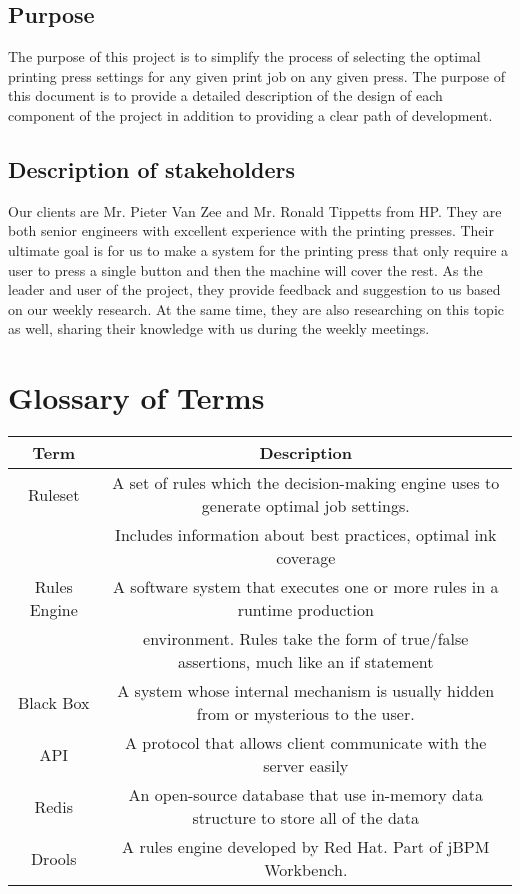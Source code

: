 \documentclass[draftclsnofoot,onecolumn,10pt,compsoc]{IEEEtran}
\begin{document}
\subsection{Purpose}
The purpose of this project is to simplify the process of selecting the optimal printing press settings for any given print job on any given press. The purpose of this document is to provide a detailed description of the design of each component of the project in addition to providing a clear path of development.

\subsection{Description of stakeholders}
Our clients are Mr. Pieter Van Zee and Mr. Ronald Tippetts from HP. They are both senior engineers with excellent experience with the printing presses. Their ultimate goal is for us to make a system for the printing press that only require a user to press a single button and then the machine will cover the rest. As the leader and user of the project, they provide feedback and suggestion to us based on our weekly research. At the same time, they are also researching on this topic as well, sharing their knowledge with us during the weekly meetings.

\bigskip
\section{Glossary of Terms}
\begin{center}
    \begin{tabular}{|c|c|}
        \hline
        \textbf{Term} & \textbf{Description}\\
        \hline
        Ruleset & A set of rules which the decision-making engine uses to generate optimal job settings.\\ & Includes information about best practices, optimal ink coverage\\
        \hline
        Rules Engine & A software system that executes one or more rules in a runtime production\\& environment. Rules take the form of true/false assertions, much like an if statement\\
        \hline
        Black Box & A system whose internal mechanism is usually hidden from or mysterious to the user. \\
        \hline
        API & A protocol that allows client communicate with the server easily\\
        \hline
        Redis & An open-source database that use in-memory data structure to store all of the data\\
        \hline
        Drools & A rules engine developed by Red Hat. Part of jBPM Workbench.\\
        \hline
    \end{tabular}
\end{center}
\end{document}
